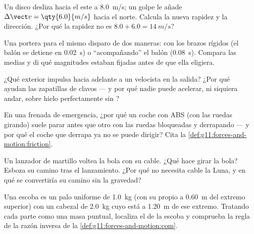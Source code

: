 \begin{exercise}[$\star\star$]\label{exo:g11:forces-and-motion:7}
Un disco desliza hacia el este a \qty{8.0}{m/s}; un golpe le añade
$\Delta \vect v = \qty{6.0}{m/s}$ hacia el norte. Calcula la nueva
rapidez y la dirección. ¿Por qué la rapidez no es
$8.0 + 6.0 = \qty{14}{m/s}$?
\end{exercise}

\begin{exercise}[$\star\star$]\label{exo:g11:forces-and-motion:8}
Una portera para el mismo disparo de dos maneras: con los brazos rígidos
(el balón se detiene en \qty{0.02}{s}) o ``acompañando'' el balón
(\qty{0.08}{s}). Compara las  medias y di qué magnitudes estaban
fijadas antes de que ella eligiera.
\end{exercise}

\begin{exercise}[$\star\star$]\label{exo:g11:forces-and-motion:9}
¿Qué  exterior impulsa hacia adelante a un velocista en la salida?
¿Por qué ayudan las zapatillas de clavos --- y por qué nadie puede
acelerar, ni siquiera andar, sobre hielo perfectamente sin ?
\end{exercise}

\begin{exercise}[$\star\star$]\label{exo:g11:forces-and-motion:10}
En una frenada de emergencia, ¿por qué un coche con ABS (con las ruedas
girando) suele parar antes que otro con las ruedas bloqueadas y
derrapando --- y por qué el coche que derrapa ya no se puede dirigir?
Cita la \cref{def:g11:forces-and-motion:friction}.
\end{exercise}

\begin{exercise}[$\star\star$]\label{exo:g11:forces-and-motion:11}
Un lanzador de martillo voltea la bola con su cable. ¿Qué  hace
girar la bola? Esboza su camino tras el lanzamiento. ¿Por qué no
necesita cable la Luna, y en qué se convertiría su camino sin la
gravedad?
\end{exercise}

\begin{exercise}[$\star\star\star$]\label{exo:g11:forces-and-motion:12}
Una escoba es un palo uniforme de \qty{1.0}{kg} (con su propio  a \qty{0.60}{m} del extremo superior) con un cabezal de
\qty{2.0}{kg} cuyo  está a \qty{1.20}{m} de ese extremo.
Tratando cada parte como una masa puntual, localiza el 
de la escoba y comprueba la regla de la razón inversa de la
\cref{def:g11:forces-and-motion:com}.
\end{exercise}

